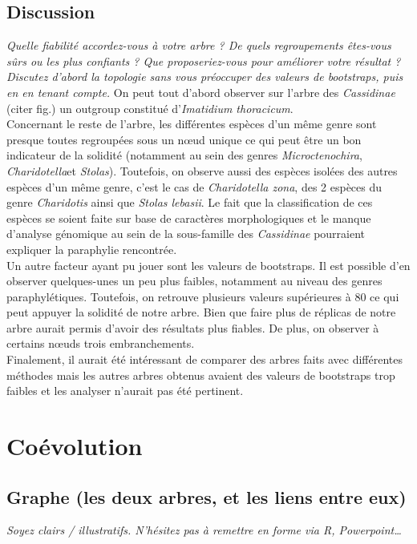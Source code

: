 \documentclass[a4paper, 12pt]{article}
\begin{document}
\subsection{Discussion}
\emph{Quelle fiabilité accordez-vous à votre arbre ? De quels regroupements êtes-vous sûrs ou les plus confiants ? Que proposeriez-vous pour améliorer votre résultat ?}
\emph{
Discutez d’abord la topologie sans vous préoccuper des valeurs de bootstraps, puis en en tenant compte.}
On peut tout d’abord observer sur l’arbre des \emph{Cassidinae} (citer fig.) un outgroup constitué d’\emph{Imatidium thoracicum}.\\
Concernant le reste de l’arbre, les différentes espèces d’un même genre sont presque toutes regroupées sous un nœud unique ce qui peut être un bon indicateur de la solidité (notamment au sein des genres \emph{Microctenochira}, \emph{Charidotella}et \emph{Stolas}). Toutefois, on observe aussi des espèces isolées des autres espèces d’un même genre, c’est le cas de \emph{Charidotella zona}, des 2 espèces du genre \emph{Charidotis} ainsi que \emph{Stolas lebasii}. Le fait que la classification de ces espèces se soient faite sur base de caractères morphologiques et le manque d’analyse génomique au sein de la sous-famille des \emph{Cassidinae} pourraient expliquer la paraphylie rencontrée.\\
Un autre facteur ayant pu jouer sont les valeurs de bootstraps. Il est possible d’en observer quelques-unes un peu plus faibles, notamment au niveau des genres paraphylétiques. Toutefois, on retrouve plusieurs valeurs supérieures à 80 ce qui peut appuyer la solidité de notre arbre. Bien que faire plus de réplicas de notre arbre aurait permis d’avoir des résultats plus fiables. De plus, on observer à certains nœuds trois embranchements.\\ 
Finalement, il aurait été intéressant de comparer des arbres faits avec différentes méthodes mais les autres arbres obtenus avaient des valeurs de bootstraps trop faibles et les analyser n’aurait pas été pertinent.


\section{Coévolution}

\subsection{Graphe (les deux arbres, et les liens entre eux)}
\emph{Soyez clairs / illustratifs. N’hésitez pas à remettre en forme via R, Powerpoint…}
\end{document}
